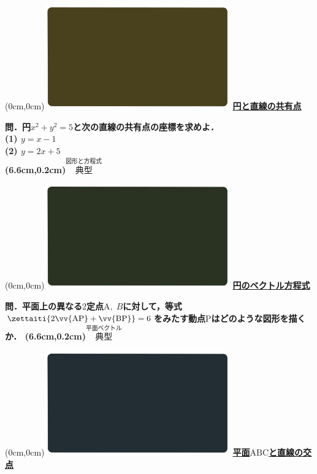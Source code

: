 \documentclass[10pt,
fleqn,
dvipdfmx,
uplatex
]{jsarticle}
\begin{document}
\newpage

\at(0cm,0cm){\includegraphics[width=8cm,bb=0 0 1920 1080]{./youtube/thumbnails/templates/smart_background/図形と方程式.jpeg}}
{\color{orange}\bf\boldmath\LARGE\underline{円と直線の共有点}}\vspace{0.3zw}

\Large 
\bf\boldmath 問．円$x^2+y^2=5$と次の直線の共有点の座標を求めよ．\\
(1)  $y=x-1$\\
(2)  $y=2x+5$\\

\at(6.6cm,0.2cm){\small\color{bradorange}$\overset{\text{図形と方程式}}{\text{典型}}$}

\newpage



\at(0cm,0cm){\includegraphics[width=8cm,bb=0 0 1920 1080]{./youtube/thumbnails/templates/smart_background/平面ベクトル.jpeg}}
{\color{orange}\bf\boldmath\LARGE\underline{円のベクトル方程式}}\vspace{0.3zw}

\Large 
\bf\boldmath 問．平面上の異なる$2$定点$\text{A},\;B$に対して，等式$\zettaiti{2\vv {\text{AP}}+\vv {\text{BP}}}=6$をみたす動点$\text{P}$はどのような図形を描くか．
\at(6.6cm,0.2cm){\small\color{bradorange}$\overset{\text{平面ベクトル}}{\text{典型}}$}


\newpage



\at(0cm,0cm){\includegraphics[width=8cm,bb=0 0 1920 1080]{./youtube/thumbnails/templates/smart_background/空間ベクトル.jpeg}}
{\color{orange}\bf\boldmath\LARGE\underline{平面$\text{ABC}$と直線の交点}}\vspace{0.3zw}
\end{document}
